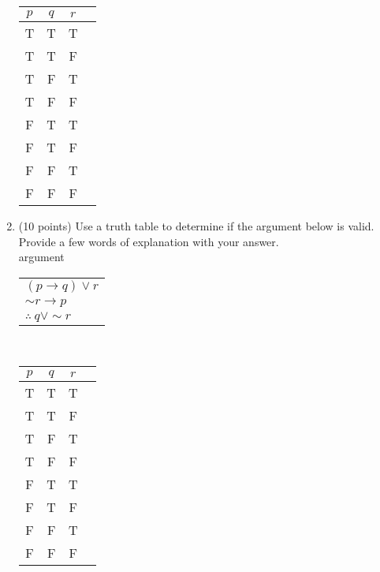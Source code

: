 \documentclass[12pt]{article}
\begin{document}
\begin{enumerate}
   {\Large{ \begin{tabular}{|c|c|c|c|}
      \hline
      $p$ & $q$ & $r$ & \hspace{5in} \\
      \hline
      \hline
      T & T & T & \\
      \hline
      T & T & F &  \\
      \hline
      T & F & T &  \\
      \hline
      T & F & F &  \\
      \hline
      F & T & T &  \\
      \hline
      F & T & F &  \\
      \hline
      F & F & T &  \\
      \hline
      F & F & F & \\
      \hline
    \end{tabular}}}
    \vfill
    \newpage

\item (10 points) Use a truth table to determine if the argument below is valid. Provide a few words of explanation with your answer.\\
      argument
      \begin{tabular}{l}
        $(p \to q) \vee r$ \\
        $\sim r \to p$ \\
      \hline
       $\therefore \: q \vee \sim r$
    \end{tabular}\\
    

    \vspace{.3in}

  { \Large{ \begin{tabular}{|c|c|c|c|}
      \hline
      $p$ & $q$ & $r$ & \hspace{5in} \\
      \hline
      \hline
      T & T & T & \\
      \hline
      T & T & F &  \\
      \hline
      T & F & T &  \\
      \hline
      T & F & F &  \\
      \hline
      F & T & T &  \\
      \hline
      F & T & F &  \\
      \hline
      F & F & T &  \\
      \hline
      F & F & F & \\
      \hline
    \end{tabular}}}
    \vfill
    \newpage


\end{enumerate}
\end{document}
